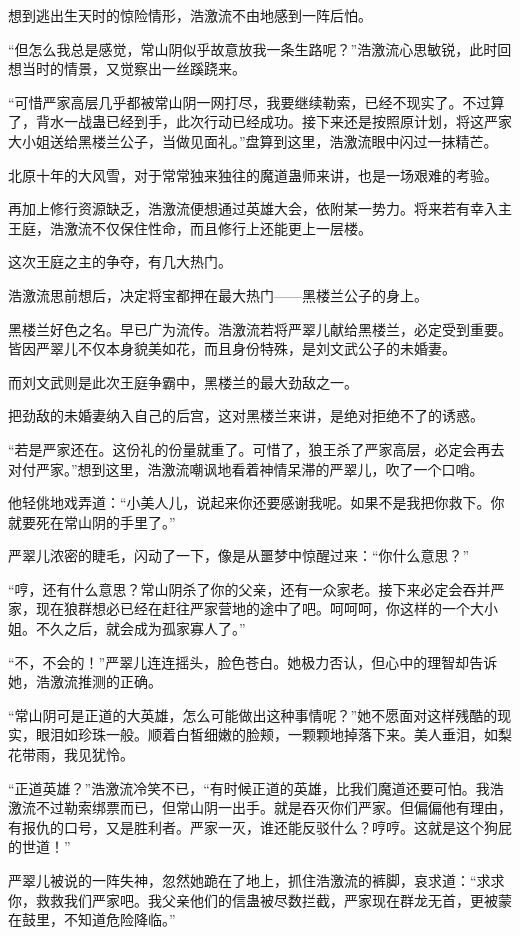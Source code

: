 \begin{this_body}
想到逃出生天时的惊险情形，浩激流不由地感到一阵后怕。

“但怎么我总是感觉，常山阴似乎故意放我一条生路呢？”浩激流心思敏锐，此时回想当时的情景，又觉察出一丝蹊跷来。

“可惜严家高层几乎都被常山阴一网打尽，我要继续勒索，已经不现实了。不过算了，背水一战蛊已经到手，此次行动已经成功。接下来还是按照原计划，将这严家大小姐送给黑楼兰公子，当做见面礼。”盘算到这里，浩激流眼中闪过一抹精芒。

北原十年的大风雪，对于常常独来独往的魔道蛊师来讲，也是一场艰难的考验。

再加上修行资源缺乏，浩激流便想通过英雄大会，依附某一势力。将来若有幸入主王庭，浩激流不仅保住性命，而且修行上还能更上一层楼。

这次王庭之主的争夺，有几大热门。

浩激流思前想后，决定将宝都押在最大热门——黑楼兰公子的身上。

黑楼兰好色之名。早已广为流传。浩激流若将严翠儿献给黑楼兰，必定受到重要。皆因严翠儿不仅本身貌美如花，而且身份特殊，是刘文武公子的未婚妻。

而刘文武则是此次王庭争霸中，黑楼兰的最大劲敌之一。

把劲敌的未婚妻纳入自己的后宫，这对黑楼兰来讲，是绝对拒绝不了的诱惑。

“若是严家还在。这份礼的份量就重了。可惜了，狼王杀了严家高层，必定会再去对付严家。”想到这里，浩激流嘲讽地看着神情呆滞的严翠儿，吹了一个口哨。

他轻佻地戏弄道：“小美人儿，说起来你还要感谢我呢。如果不是我把你救下。你就要死在常山阴的手里了。”

严翠儿浓密的睫毛，闪动了一下，像是从噩梦中惊醒过来：“你什么意思？”

“哼，还有什么意思？常山阴杀了你的父亲，还有一众家老。接下来必定会吞并严家，现在狼群想必已经在赶往严家营地的途中了吧。呵呵呵，你这样的一个大小姐。不久之后，就会成为孤家寡人了。”

“不，不会的！”严翠儿连连摇头，脸色苍白。她极力否认，但心中的理智却告诉她，浩激流推测的正确。

“常山阴可是正道的大英雄，怎么可能做出这种事情呢？”她不愿面对这样残酷的现实，眼泪如珍珠一般。顺着白皙细嫩的脸颊，一颗颗地掉落下来。美人垂泪，如梨花带雨，我见犹怜。

“正道英雄？”浩激流冷笑不已，“有时候正道的英雄，比我们魔道还要可怕。我浩激流不过勒索绑票而已，但常山阴一出手。就是吞灭你们严家。但偏偏他有理由，有报仇的口号，又是胜利者。严家一灭，谁还能反驳什么？哼哼。这就是这个狗屁的世道！”

严翠儿被说的一阵失神，忽然她跪在了地上，抓住浩激流的裤脚，哀求道：“求求你，救救我们严家吧。我父亲他们的信蛊被尽数拦截，严家现在群龙无首，更被蒙在鼓里，不知道危险降临。”


\end{this_body}
